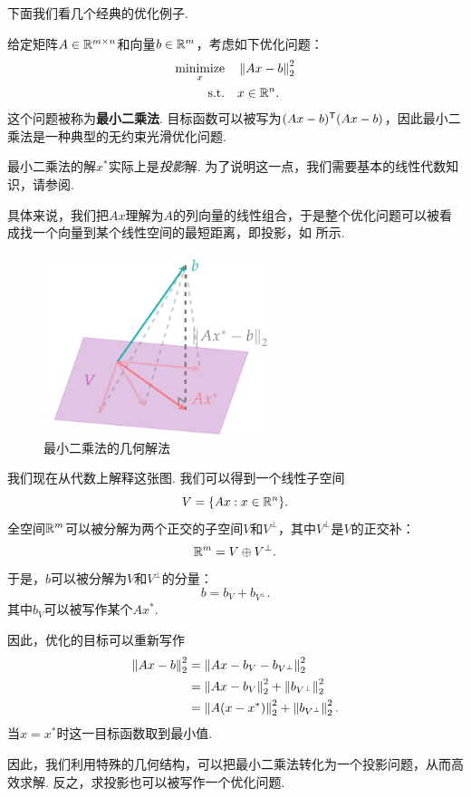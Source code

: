 下面我们看几个经典的优化例子. 
\begin{example}[最小二乘法]\label{ex:least-square}
    给定矩阵$A\in\mathbb{R}^{m\times n}$和向量$b\in\mathbb{R}^m$，考虑如下优化问题：
    \begin{alignat*}{2}
    \operatorname*{minimize}_{x}&\quad \left\|Ax-b\right\|_2^2\\
    \text{s.t.}&\quad x\in\mathbb{R}^n.
    \end{alignat*}
    这个问题被称为\textbf{最小二乘法}. 目标函数可以被写为$(Ax-b)^{\mathsf{T}}(Ax-b)$，因此最小二乘法是一种典型的无约束光滑优化问题. 

    最小二乘法的解$x^*$实际上是\textit{投影}解. 为了说明这一点，我们需要基本的线性代数知识，请参阅. 
    
    具体来说，我们把$Ax$理解为$A$的列向量的线性组合，于是整个优化问题可以被看成找一个向量到某个线性空间的最短距离，即投影，如 所示. 
    \begin{figure}[H]
    \centering
    \includegraphics[width=0.6\textwidth]{figures/convex-anlaysis/projecting.pdf}
    \caption{最小二乘法的几何解法}\label{fig:projecting}
    \end{figure}

    我们现在从代数上解释这张图. 我们可以得到一个线性子空间
    \[V=\{Ax:x\in\mathbb{R}^n\}.\]
    全空间$\mathbb{R}^m$可以被分解为两个正交的子空间$V$和$V^\perp$，其中$V^\perp$是$V$的正交补：
    \[\mathbb{R}^m=V\oplus V^\perp.\]
    于是，$b$可以被分解为$V$和$V^\perp$的分量：
    \[b=b_V+b_{V^\perp}.\]
    其中$b_V$可以被写作某个$Ax^*$. 
    
    因此，优化的目标可以重新写作
    \begin{align*}
        \left\|Ax-b\right\|_2^2&=\left\|Ax-b_V-b_{V^\perp}\right\|_2^2\\
        &=\left\|Ax-b_V\right\|_2^2+\left\|b_{V^\perp}\right\|_2^2\\
        &=\left\|A(x-x^*)\right\|_2^2+\left\|b_{V^\perp}\right\|_2^2.
    \end{align*}
    当$x=x^*$时这一目标函数取到最小值. 
    
    因此，我们利用特殊的几何结构，可以把最小二乘法转化为一个投影问题，从而高效求解. 反之，求投影也可以被写作一个优化问题. 
\end{example}

